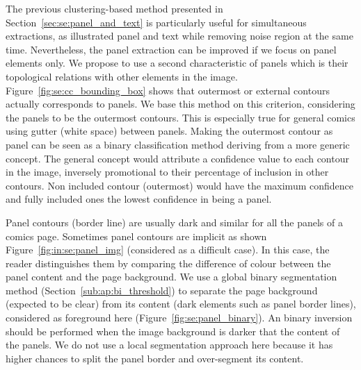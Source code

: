 The previous clustering-based method presented in Section~\ref{sec:se:panel_and_text} is particularly useful for simultaneous extractions, as illustrated panel and text while removing noise region at the same time.
Nevertheless, the panel extraction can be improved if we focus on panel elements only.
We propose to use a second characteristic of panels which is their topological relations with other elements in the image.
Figure~\ref{fig:se:cc_bounding_box} shows that outermost or external contours actually corresponds to panels.
We base this method on this criterion, considering the panels to be the outermost contours.
This is especially true for general comics using gutter (white space) between panels.
Making the outermost contour as panel can be seen as a binary classification method deriving from a more generic concept.
The general concept would attribute a confidence value to each contour in the image, inversely promotional to their percentage of inclusion in other contours.
Non included contour (outermost) would have the maximum confidence and fully included ones the lowest confidence in being a panel.


Panel contours (border line) are usually dark and similar for all the panels of a comics page.
Sometimes panel contours are implicit as shown Figure~\ref{fig:in:se:panel_img} (considered as a difficult case).
In this case, the reader distinguishes them by comparing the difference of colour between the panel content and the page background.
We use a global binary segmentation method (Section~\ref{sub:ap:bi_threshold}) to separate the page background (expected to be clear) from its content (dark elements such as panel border lines), considered as foreground here (Figure~\ref{fig:se:panel_binary}).
An binary inversion should be performed when the image background is darker that the content of the panels.
We do not use a local segmentation approach here because it has higher chances to split the panel border and over-segment its content.

